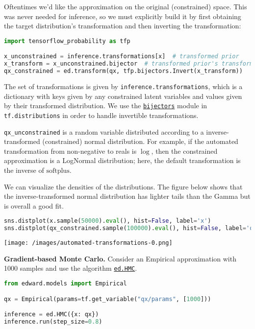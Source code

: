 Oftentimes we'd like the approximation on the original (constrained)
space. This was never needed for inference, so we must explicitly
build it by first obtaining the target distribution's transformation
and then inverting the transformation:

\begin{lstlisting}[language=Python]
import tensorflow_probability as tfp

x_unconstrained = inference.transformations[x]  # transformed prior
x_transform = x_unconstrained.bijector  # transformed prior's transformation
qx_constrained = ed.transform(qx, tfp.bijectors.Invert(x_transform))
\end{lstlisting}

The set of transformations is given by
\texttt{inference.transformations}, which is a dictionary with keys
given by any constrained latent variables and values given by their
transformed distribution. We use the
\href{https://www.tensorflow.org/probability/api_docs/python/tfp/bijectors}{\texttt{bijectors}}
module in \texttt{tf.distributions} in order to handle invertible
transformations.

\texttt{qx\_unconstrained} is a random variable distributed
according to a inverse-transformed (constrained) normal distribution.
For example, if the automated transformation from non-negative to
reals is $\log$, then the constrained approximation is a LogNormal
distribution; here, the default transformation is the inverse of
$\textrm{softplus}$.

We can visualize the densities of the distributions.
The figure below shows that the inverse-transformed normal
distribution has lighter tails than the Gamma but is overall a
good fit.

\begin{lstlisting}[language=Python]
sns.distplot(x.sample(50000).eval(), hist=False, label='x')
sns.distplot(qx_constrained.sample(100000).eval(), hist=False, label='qx')
\end{lstlisting}

\texttt{[image: /images/automated-transformations-0.png]}

\textbf{Gradient-based Monte Carlo.}
Consider an Empirical approximation with 1000 samples
and use the algorithm \href{/api/ed/HMC}{\texttt{ed.HMC}}.

\begin{lstlisting}[language=Python]
from edward.models import Empirical

qx = Empirical(params=tf.get_variable("qx/params", [1000]))

inference = ed.HMC({x: qx})
inference.run(step_size=0.8)
\end{lstlisting}

